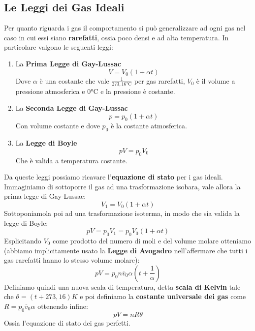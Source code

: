 \documentclass{article}
\begin{document}
\subsection{Le Leggi dei Gas Ideali}
Per quanto riguarda i gas il comportamento si può generalizzare ad ogni gas nel caso in cui essi siano \textbf{rarefatti}, ossia poco densi e ad alta temperatura. In particolare valgono le seguenti leggi:
\begin{enumerate}
    \item La \textbf{Prima Legge di Gay-Lussac} \[V=V_0(1+\alpha t)\]
    Dove $\alpha$ è una costante che vale $\frac{1}{273,16\si{\degreeCelsius}}$ per gas rarefatti, $V_0$ è il volume a pressione atmosferica e $0\si{\degreeCelsius}$ e la pressione è costante.
    \item La \textbf{Seconda Legge di Gay-Lussac} \[p=p_0(1+\alpha t)\]
    Con volume costante e dove $p_0$ è la costante atmosferica.
    \item La \textbf{Legge di Boyle} \[pV=p_0V_0\]
    Che è valida a temperatura costante.
\end{enumerate}
Da queste leggi possiamo ricavare l'\textbf{equazione di stato} per i gas ideali. Immaginiamo di sottoporre il gas ad una trasformazione isobara, vale allora la prima legge di Gay-Lussac:
\[V_1=V_0(1+\alpha t)\]
Sottoponiamola poi ad una trasformazione isoterma, in modo che sia valida la legge di Boyle:
\[pV=p_0V_1=p_0V_0(1+\alpha t)\]
Esplicitando $V_0$ come prodotto del numero di moli e del volume molare otteniamo (abbiamo implicitamente usato la \textbf{Legge di Avogadro} nell'affermare che tutti i gas rarefatti hanno lo stesso volume molare):
\[pV=p_0n\overline{v}_0\alpha \left(t+\frac{1}{\alpha}\right)\]
Definiamo quindi una nuova scala di temperatura, detta \textbf{scala di Kelvin} tale che $\theta=(t+273,16)K$ e poi definiamo la \textbf{costante universale dei gas} come $R=p_0\overline{v}_0\alpha$ ottenendo infine:
\begin{equation}
\boxed{pV=nR\theta}
\end{equation}
Ossia l'equazione di stato dei gas perfetti.
\end{document}
